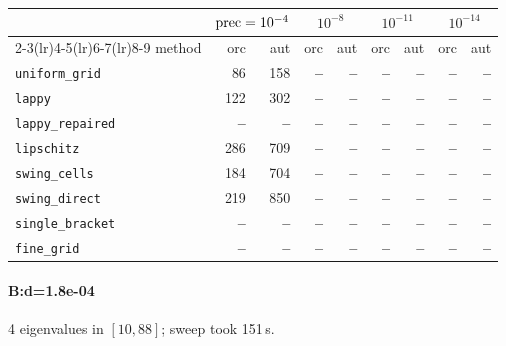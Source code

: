 \begin{center}
\small
\begin{tabular}{lrrrrrrrr}
\toprule
& \multicolumn{2}{c}{$\mathrm{prec}=10^{-4}$} & \multicolumn{2}{c}{$10^{-8}$} & \multicolumn{2}{c}{$10^{-11}$} & \multicolumn{2}{c}{$10^{-14}$} \\
\cmidrule(lr){2-3}\cmidrule(lr){4-5}\cmidrule(lr){6-7}\cmidrule(lr){8-9}
method & orc & aut & orc & aut & orc & aut & orc & aut \\
\midrule
\texttt{uniform\_grid} & 86 & 158 & \textbf{--} & \textbf{--} & \textbf{--} & \textbf{--} & \textbf{--} & \textbf{--} \\
\texttt{lappy} & 122 & 302 & \textbf{--} & \textbf{--} & \textbf{--} & \textbf{--} & \textbf{--} & \textbf{--} \\
\texttt{lappy\_repaired} & \textbf{--} & \textbf{--} & \textbf{--} & \textbf{--} & \textbf{--} & \textbf{--} & \textbf{--} & \textbf{--} \\
\texttt{lipschitz} & 286 & 709 & \textbf{--} & \textbf{--} & \textbf{--} & \textbf{--} & \textbf{--} & \textbf{--} \\
\texttt{swing\_cells} & 184 & 704 & \textbf{--} & \textbf{--} & \textbf{--} & \textbf{--} & \textbf{--} & \textbf{--} \\
\texttt{swing\_direct} & 219 & 850 & \textbf{--} & \textbf{--} & \textbf{--} & \textbf{--} & \textbf{--} & \textbf{--} \\
\midrule
\texttt{single\_bracket} & \textbf{--} & \textbf{--} & \textbf{--} & \textbf{--} & \textbf{--} & \textbf{--} & \textbf{--} & \textbf{--} \\
\texttt{fine\_grid} & \textbf{--} & \textbf{--} & \textbf{--} & \textbf{--} & \textbf{--} & \textbf{--} & \textbf{--} & \textbf{--} \\
\bottomrule
\end{tabular}
\end{center}

\paragraph{B:d=1.8e-04} 4 eigenvalues in $[10, 88]$; sweep took 151\,s.

